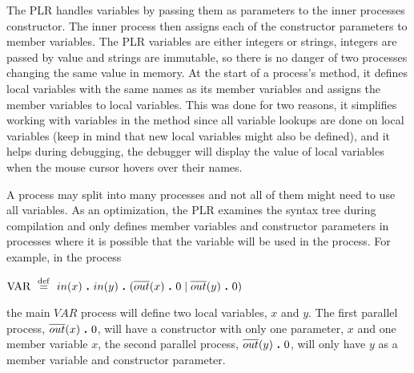 	The PLR handles variables by passing them as parameters to the inner 
	processes constructor. The inner process then assigns each of the 
	constructor parameters to member variables. The PLR variables are either 
	integers or strings, integers are passed by value and strings are immutable, 
	so there is no danger of two processes changing the same value in memory. At 
	the start of a process's  method, it defines local 
	variables with the same names as its member variables and assigns the member 
	variables to local variables. This was done for two reasons, it simplifies 
	working with variables in the method since all variable lookups are done on 
	local variables (keep in mind that new local variables might also be 
	defined), and it helps during debugging, the debugger will display the value 
	of local variables when the mouse cursor hovers over their names.
	
  A process may split into many processes and not all of them might need to 
  use all variables. As an optimization, the PLR examines the syntax tree 
  during compilation and only defines member variables and constructor 
  parameters in processes where it is possible that the variable will be used 
  in the process. For example, in the process
  
  \begin{center}$\mathrm{VAR} \ \stackrel{\mathrm{def}}{=}\  in(x) \ \textbf{.}\  in(y)\ \textbf{.}\  (\overline{out}(x) \ \textbf{.}\  0 \mid \overline{out}(y) \ \textbf{.}\  0)$\end{center}
  
	the main $VAR$ process will define two local variables, $x$ and $y$. The 
	first parallel process, $\overline{out}(x) \ \textbf{.}\  0$, will have a 
	constructor with only one parameter, $x$ and one member variable $x$, the 
	second parallel process, $\overline{out}(y) \ \textbf{.}\  0$, will only have $y$ 
	as a member variable and constructor parameter.
  